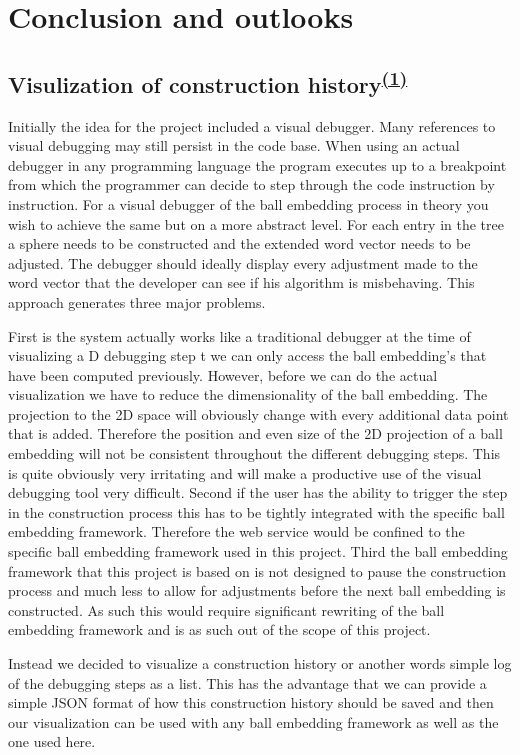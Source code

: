 \chapter{Conclusion and outlooks}

\section[Visulization of construction history]{Visulization of construction history\textsuperscript{\hyperref[Jan]{(1)}}}
Initially the idea for the project included a visual debugger. Many references to visual debugging may still persist in the code base. When using an actual debugger in any programming language the program executes up to a breakpoint from which the programmer can decide to step through the code instruction by instruction. For a visual debugger of the ball embedding process in theory you wish to achieve the same but on a more abstract level. For each entry in the tree a sphere needs to be constructed and the extended word vector needs to be adjusted. The debugger should ideally display every adjustment made to the word vector that the developer can see if his algorithm is misbehaving. This approach generates three major problems. 

First is the system actually works like a traditional debugger at the time of visualizing a D debugging step t we can only access the ball embedding's that have been computed previously. However, before we can do the actual visualization we have to reduce the dimensionality of the ball embedding. The projection to the 2D space will obviously change with every additional data point that is added. Therefore the position and even size of the 2D projection of a ball embedding will not be consistent throughout the different debugging steps. This is quite obviously very irritating and will make a productive use of the visual debugging tool very difficult.
Second if the user has the ability to trigger the step in the construction process this has to be tightly integrated with the specific ball embedding framework. Therefore the web service would be confined to the specific ball embedding framework used in this project. 
Third the ball embedding framework that this project is based on is not designed to pause the construction process and much less to allow for adjustments before the next ball embedding is constructed. As such this would require significant rewriting of the ball embedding framework and is as such out of the scope of this project.

Instead we decided to visualize a construction history or another words simple log of the debugging steps as a list. This has the advantage that we can provide a simple JSON format of how this construction history should be saved and then our visualization can be used with any ball embedding framework as well as the one used here.

